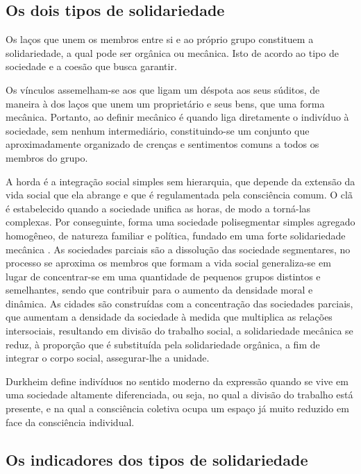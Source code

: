 \subsection{Os dois tipos de solidariedade}

Os laços que unem os membros entre si e ao próprio grupo constituem a solidariedade, a qual pode ser orgânica ou mecânica. 
Isto de acordo ao tipo de sociedade e a coesão que busca garantir. 

Os vínculos assemelham-se aos que ligam um déspota aos seus súditos, de maneira à dos laços que unem um proprietário e seus bens, que uma forma mecânica.
Portanto, ao definir mecânico é quando liga diretamente o indivíduo à sociedade, sem nenhum intermediário, constituindo-se um conjunto que aproximadamente organizado de crenças e sentimentos comuns a todos os membros do grupo.

A horda é a integração social simples sem hierarquia, que depende da extensão da vida social que ela abrange e que é regulamentada pela consciência comum.
O clã é estabelecido quando a sociedade unifica as horas, de modo a torná-las complexas.
Por conseguinte,  forma uma sociedade polisegmentar simples agregado homogêneo, de natureza familiar e política, fundado em uma forte solidariedade mecânica \cite{quintaneiro2003toque}.
As sociedades parciais são a dissolução das sociedade segmentares, no processo se aproxima os membros que formam a vida social generaliza-se em lugar de concentrar-se em uma quantidade  de pequenos grupos distintos e semelhantes, sendo que contribuir para o aumento da densidade moral e dinâmica.
As cidades são construídas com a concentração das sociedades parciais, que aumentam a densidade da sociedade à medida que multiplica as relações intersociais, resultando em divisão do trabalho social, a solidariedade mecânica se reduz, à proporção que é substituída pela solidariedade orgânica, a fim de integrar o corpo social, assegurar-lhe a unidade.

Durkheim define indivíduos no sentido moderno da expressão quando se vive em uma sociedade altamente diferenciada, ou seja, no qual a divisão do trabalho está presente, e na qual a consciência coletiva ocupa um espaço já muito reduzido em face da consciência individual.  


\subsection{Os indicadores dos tipos de solidariedade}

